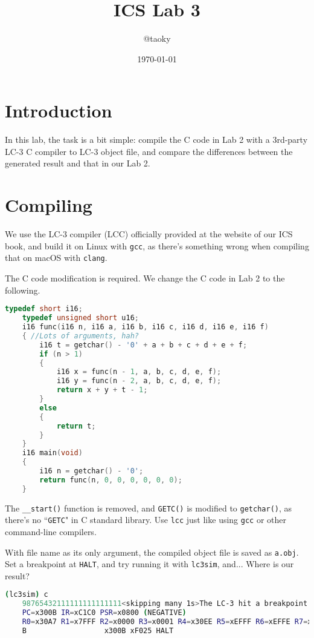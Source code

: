 \documentclass{article}
\title{ICS Lab 3}
\author{@taoky}
\date{\today}
\begin{document}
	\maketitle
	\section{Introduction}
	In this lab, the task is a bit simple: compile the C code in Lab 2 with a 3rd-party LC-3 C compiler to LC-3 object file, and compare the differences between the generated result and that in our Lab 2.
	
	\section{Compiling}
	We use the LC-3 compiler (LCC) officially provided at the website of our ICS book\cite{lcc}, and build it on Linux with \texttt{gcc}, as there's something wrong when compiling that on macOS with \texttt{clang}. 
	
	The C code modification is required. We change the C code in Lab 2 to the following.
	
	\begin{lstlisting}[language=c, caption={The compiled C code}]
	typedef short i16;
	typedef unsigned short u16;
	i16 func(i16 n, i16 a, i16 b, i16 c, i16 d, i16 e, i16 f)
	{ //Lots of arguments, hah?
	    i16 t = getchar() - '0' + a + b + c + d + e + f;
	    if (n > 1)
	    {
	        i16 x = func(n - 1, a, b, c, d, e, f);
	        i16 y = func(n - 2, a, b, c, d, e, f);
	        return x + y + t - 1;
	    }
	    else
	    {
	        return t;
	    }
	}
	i16 main(void)
	{
	    i16 n = getchar() - '0';
	    return func(n, 0, 0, 0, 0, 0, 0);
	}
	\end{lstlisting}
	
	The \texttt{\_\_start()} function is removed, and \texttt{GETC()} is modified to \texttt{getchar()}, as there's no ``\texttt{GETC}" in C standard library. Use \texttt{lcc} just like using \texttt{gcc} or other command-line compilers.
	
	With file name as its only argument, the compiled object file is saved as \texttt{a.obj}. Set a breakpoint at \texttt{HALT}, and try running it with \texttt{lc3sim}, and... Where is our result?
	
	\begin{lstlisting}[language=sh, caption={Where is the result?}]
	(lc3sim) c
	98765432111111111111111<skipping many 1s>The LC-3 hit a breakpoint...
	PC=x300B IR=xC1C0 PSR=x0800 (NEGATIVE)
	R0=x30A7 R1=x7FFF R2=x0000 R3=x0001 R4=x30EE R5=xEFFF R6=xEFFE R7=x300B 
	B                  x300B xF025 HALT 
	\end{lstlisting}
	
\end{document}
